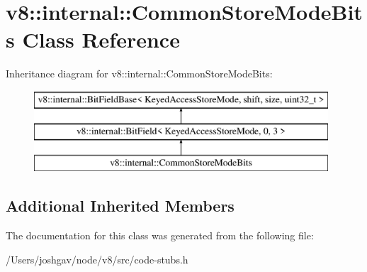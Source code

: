 \hypertarget{classv8_1_1internal_1_1_common_store_mode_bits}{}\section{v8\+:\+:internal\+:\+:Common\+Store\+Mode\+Bits Class Reference}
\label{classv8_1_1internal_1_1_common_store_mode_bits}
Inheritance diagram for v8\+:\+:internal\+:\+:Common\+Store\+Mode\+Bits\+:\begin{figure}[H]
\begin{center}
\leavevmode
\includegraphics[height=3.000000cm]{classv8_1_1internal_1_1_common_store_mode_bits}
\end{center}
\end{figure}
\subsection*{Additional Inherited Members}


The documentation for this class was generated from the following file\+:\begin{DoxyCompactItemize}
\item 
/\+Users/joshgav/node/v8/src/code-\/stubs.\+h\end{DoxyCompactItemize}
